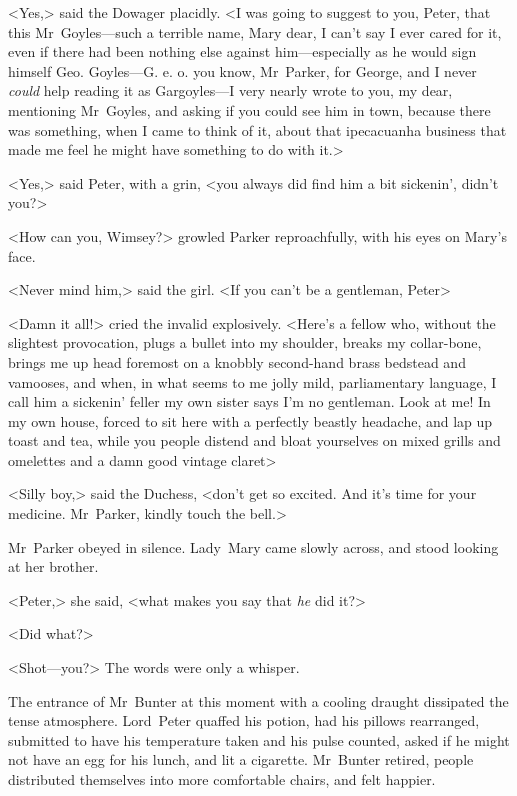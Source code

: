 <Yes,> said the Dowager placidly. <I was going to suggest to you, Peter, that this Mr~Goyles—such a terrible name, Mary dear, I can't say I ever cared for it, even if there had been nothing else against him—especially as he would sign himself Geo. Goyles—G\@. e. o. you know, Mr~Parker, for George, and I never \emph{could} help reading it as Gargoyles—I very nearly wrote to you, my dear, mentioning Mr~Goyles, and asking if you could see him in town, because there was something, when I came to think of it, about that ipecacuanha business that made me feel he might have something to do with it.>

<Yes,> said Peter, with a grin, <you always did find him a bit sickenin', didn't you?>

<How can you, Wimsey?> growled Parker reproachfully, with his eyes on Mary's face.

<Never mind him,> said the girl. <If you can't be a gentleman, Peter\longdash>

<Damn it all!> cried the invalid explosively. <Here's a fellow who, without the slightest provocation, plugs a bullet into my shoulder, breaks my collar-bone, brings me up head foremost on a knobbly second-hand brass bedstead and vamooses, and when, in what seems to me jolly mild, parliamentary language, I call him a sickenin' feller my own sister says I'm no gentleman. Look at me! In my own house, forced to sit here with a perfectly beastly headache, and lap up toast and tea, while you people distend and bloat yourselves on mixed grills and omelettes and a damn good vintage claret\longdash>

<Silly boy,> said the Duchess, <don't get so excited. And it's time for your medicine. Mr~Parker, kindly touch the bell.>

Mr~Parker obeyed in silence. Lady~Mary came slowly across, and stood looking at her brother.

<Peter,> she said, <what makes you say that \emph{he} did it?>

<Did what?>

<Shot—you?> The words were only a whisper.

The entrance of Mr~Bunter at this moment with a cooling draught dissipated the tense atmosphere. Lord~Peter quaffed his potion, had his pillows rearranged, submitted to have his temperature taken and his pulse counted, asked if he might not have an egg for his lunch, and lit a cigarette. Mr~Bunter retired, people distributed themselves into more comfortable chairs, and felt happier.

